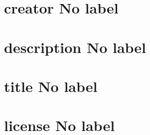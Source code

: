 \documentclass[letterpaper,10pt,english]{sphinxmanual}
\begin{document}
\section{creator \sphinxhyphen{} No label}
\label{\detokenize{doc-creator:creator-no-label}}\label{\detokenize{doc-creator:index-0}}\label{\detokenize{doc-creator::doc}}\begin{quote}
\label{\detokenize{doc-description:description}}\label{\detokenize{doc-description:no-label}}\label{\detokenize{doc-description:description}}
\ignorespaces \end{quote}


\section{description \sphinxhyphen{} No label}
\label{\detokenize{doc-description:description-no-label}}\label{\detokenize{doc-description:index-0}}\label{\detokenize{doc-description::doc}}\begin{quote}
\label{\detokenize{doc-title:title}}\label{\detokenize{doc-title:no-label}}\label{\detokenize{doc-title:title}}
\ignorespaces \end{quote}


\section{title \sphinxhyphen{} No label}
\label{\detokenize{doc-title:title-no-label}}\label{\detokenize{doc-title:index-0}}\label{\detokenize{doc-title::doc}}\begin{quote}
\label{\detokenize{doc-license:license}}\label{\detokenize{doc-license:no-label}}\label{\detokenize{doc-license:license}}
\ignorespaces \end{quote}


\section{license \sphinxhyphen{} No label}
\label{\detokenize{doc-license:license-no-label}}\label{\detokenize{doc-license:index-0}}\label{\detokenize{doc-license::doc}}\begin{quote}
\label{\detokenize{doc-inverseOf:inverseof}}\label{\detokenize{doc-inverseOf:no-label}}\label{\detokenize{doc-inverseOf:inverseof}}
\ignorespaces \end{quote}
\end{document}
